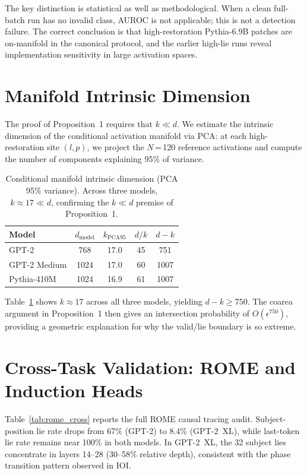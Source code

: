 \documentclass{article}
\begin{document}
The key distinction is statistical as well as methodological. When a clean full-batch run has no invalid class, AUROC is not applicable; this is not a detection failure. The correct conclusion is that high-restoration Pythia-6.9B patches are on-manifold in the canonical protocol, and the earlier high-lie runs reveal implementation sensitivity in large activation spaces.

\section{Manifold Intrinsic Dimension}
\label{app:manifold_dim}

The proof of Proposition~1 requires that $k \ll d$. We estimate the intrinsic dimension of the conditional activation manifold via PCA: at each high-restoration site $(l, p)$, we project the $N$\,=\,120 reference activations and compute the number of components explaining 95\% of variance.

\begin{table}[h]
\caption{Conditional manifold intrinsic dimension (PCA 95\% variance). Across three models, $k \approx 17 \ll d$, confirming the $k \ll d$ premise of Proposition~1.}
\label{tab:manifold_dim}
\begin{center}\small
\begin{tabular}{lcccc}
\toprule
\textbf{Model} & $d_\text{model}$ & $k_{\text{PCA95}}$ & $d / k$ & $d - k$ \\
\midrule
GPT-2 & 768 & 17.0 & 45 & 751 \\
GPT-2 Medium & 1024 & 17.0 & 60 & 1007 \\
Pythia-410M & 1024 & 16.9 & 61 & 1007 \\
\bottomrule
\end{tabular}
\end{center}
\end{table}

Table~\ref{tab:manifold_dim} shows $k \approx 17$ across all three models, yielding $d - k \geq 750$. The coarea argument in Proposition~1 then gives an intersection probability of $O(\epsilon^{750})$, providing a geometric explanation for why the valid/lie boundary is so extreme.

\section{Cross-Task Validation: ROME and Induction Heads}
\label{app:cross_task}

Table~\ref{tab:rome_cross} reports the full ROME causal tracing audit. Subject-position lie rate drops from 67\% (GPT-2) to 8.4\% (GPT-2~XL), while last-token lie rate remains near 100\% in both models. In GPT-2~XL, the 32 subject lies concentrate in layers 14--28 (30--58\% relative depth), consistent with the phase transition pattern observed in IOI.
\end{document}
